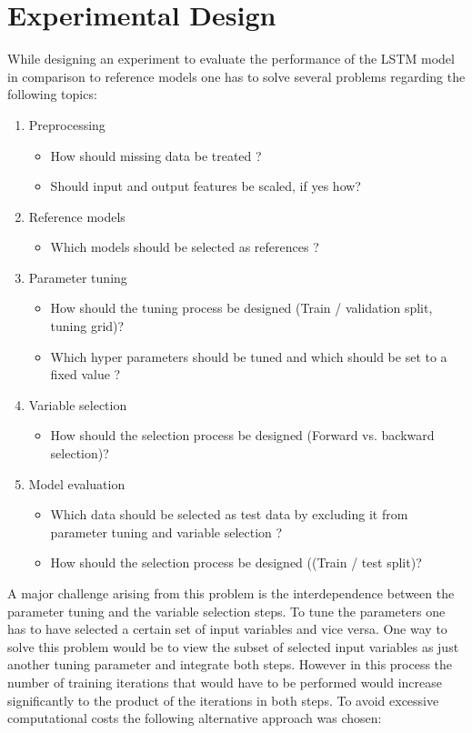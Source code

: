 \chapter{Experimental Design}
While designing an experiment to evaluate the performance of the LSTM model in comparison to reference models one has to solve several problems regarding the following topics:
\begin{enumerate}
\item Preprocessing\begin{itemize}
	\item How should missing data be treated ?
	\item Should input and output features be scaled, if yes how?
\end{itemize}
\item Reference models\begin{itemize}
	\item Which models should be selected as references ?
\end{itemize}
\item Parameter tuning \begin{itemize}
	\item How should the tuning process be designed (Train / validation split, tuning grid)? 
	\item Which hyper parameters should be tuned and which should be set to a fixed value ?
\end{itemize}
\item Variable selection \begin{itemize}
	\item How should the selection process be designed (Forward vs. backward selection)? 
\end{itemize}
\item Model evaluation \begin{itemize}
\item Which data should be selected as test data by excluding it from parameter tuning and variable selection ?
\item How should the selection process be designed ((Train / test split)? 
\end{itemize}	
\end{enumerate}

A major challenge arising from this problem is the interdependence between the parameter tuning and the variable selection steps. To tune the parameters one has to have selected a certain set of input variables and vice versa. One way to solve this problem would be to view the subset of selected input variables as just another tuning parameter and integrate both steps. However in this process the number of training iterations that would have to be performed would increase significantly to the product of the iterations in both steps. To avoid excessive computational costs the following alternative approach was chosen:

